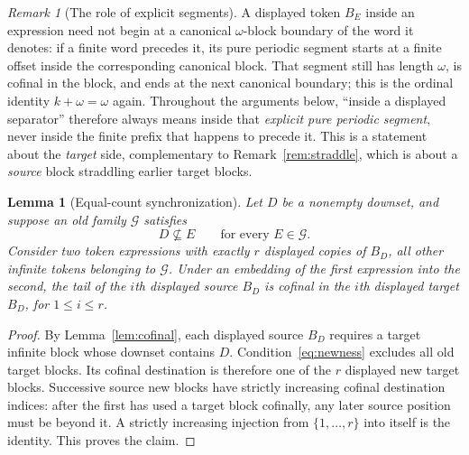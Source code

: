 \documentclass[11pt,a4paper]{article}
\numberwithin{equation}{section}
\newtheorem{lemma}[theorem]{Lemma}
\theoremstyle{definition}
\theoremstyle{remark}
\newtheorem{remark}[theorem]{Remark}
\newcommand{\G}{\mathcal G}
\begin{document}
\begin{remark}[The role of explicit segments]\label{rem:explicit}
A displayed token $B_E$ inside an expression need not begin at a canonical
$\omega$-block boundary of the word it denotes: if a finite word precedes it,
its pure periodic segment starts at a finite offset inside the corresponding
canonical block. That segment still has length $\omega$, is cofinal in the
block, and ends at the next canonical boundary; this is the ordinal identity
$k+\omega=\omega$ again. Throughout the arguments below, ``inside a displayed
separator'' therefore always means inside that \emph{explicit pure periodic
segment}, never inside the finite prefix that happens to precede it. This is a
statement about the \emph{target} side, complementary to
Remark~\ref{rem:straddle}, which is about a \emph{source} block straddling
earlier target blocks.
\end{remark}

\begin{lemma}[Equal-count synchronization]\label{lem:sync}
Let $D$ be a nonempty downset, and suppose an old family $\G$ satisfies
\begin{equation}\label{eq:newness}
  D\nsubseteq E\qquad\text{for every }E\in\G.
\end{equation}
Consider two token expressions with exactly $r$ displayed copies of $B_D$,
all other infinite tokens belonging to $\G$. Under an embedding of the
first expression into the second, the tail of the $i$th displayed source
$B_D$ is cofinal in the $i$th displayed target $B_D$, for $1\le i\le r$.
\end{lemma}
\begin{proof}
By Lemma~\ref{lem:cofinal}, each displayed source $B_D$ requires a target
infinite block whose downset contains $D$. Condition~\eqref{eq:newness}
excludes all old target blocks. Its cofinal destination is therefore one
of the $r$ displayed new target blocks. Successive source new blocks have
strictly increasing cofinal destination indices: after the first has used
a target block cofinally, any later source position must be beyond it.
A strictly increasing injection from $\{1,\ldots,r\}$ into itself is the
identity. This proves the claim.
\end{proof}
\end{document}
